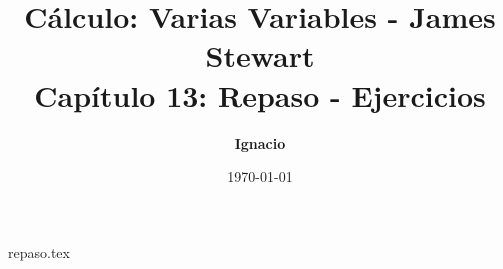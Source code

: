 \documentclass[11pt,spanish,oneside]{report}
\title{\textbf{Cálculo: Varias Variables - James Stewart} \\ \Large Capítulo 13: Repaso - Ejercicios}
\author{\textbf{Ignacio}}
\date{\today}
\begin{document}
\maketitle

{repaso.tex}
\end{document}
